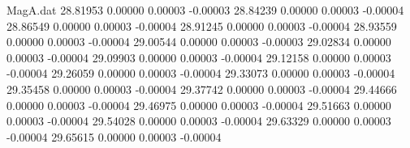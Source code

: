 \begin{filecontents}{MagA.dat}
  28.81953    0.00000    0.00003   -0.00003
  28.84239    0.00000    0.00003   -0.00004
  28.86549    0.00000    0.00003   -0.00004
  28.91245    0.00000    0.00003   -0.00004
  28.93559    0.00000    0.00003   -0.00004
  29.00544    0.00000    0.00003   -0.00003
  29.02834    0.00000    0.00003   -0.00004
  29.09903    0.00000    0.00003   -0.00004
  29.12158    0.00000    0.00003   -0.00004
  29.26059    0.00000    0.00003   -0.00004
  29.33073    0.00000    0.00003   -0.00004
  29.35458    0.00000    0.00003   -0.00004
  29.37742    0.00000    0.00003   -0.00004
  29.44666    0.00000    0.00003   -0.00004
  29.46975    0.00000    0.00003   -0.00004
  29.51663    0.00000    0.00003   -0.00004
  29.54028    0.00000    0.00003   -0.00004
  29.63329    0.00000    0.00003   -0.00004
  29.65615    0.00000    0.00003   -0.00004
\end{filecontents}
